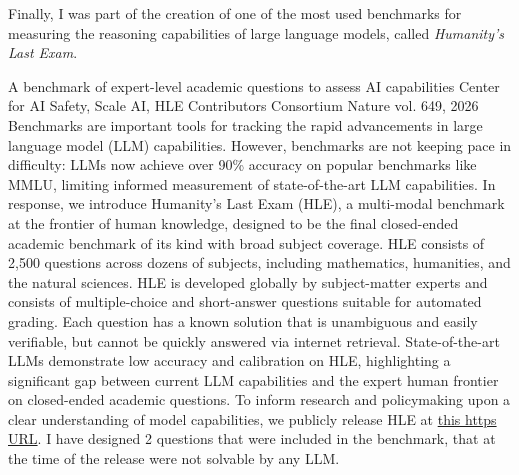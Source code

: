 Finally, I was part of the creation of one of the most used benchmarks for measuring the reasoning capabilities of large language models, called \emph{Humanity's Last Exam}.
\begin{contribution}
  {A benchmark of expert-level academic questions to assess {AI} capabilities}
  {{Center for AI Safety}, {Scale AI}, {HLE Contributors Consortium}}
  {Nature vol. 649, 2026}
  {Benchmarks are important tools for tracking the rapid advancements in large language model (LLM) capabilities. However, benchmarks are not keeping pace in difficulty: LLMs now achieve over 90\% accuracy on popular benchmarks like MMLU, limiting informed measurement of state-of-the-art LLM capabilities. In response, we introduce Humanity's Last Exam (HLE), a multi-modal benchmark at the frontier of human knowledge, designed to be the final closed-ended academic benchmark of its kind with broad subject coverage. HLE consists of 2,500 questions across dozens of subjects, including mathematics, humanities, and the natural sciences. HLE is developed globally by subject-matter experts and consists of multiple-choice and short-answer questions suitable for automated grading. Each question has a known solution that is unambiguous and easily verifiable, but cannot be quickly answered via internet retrieval. State-of-the-art LLMs demonstrate low accuracy and calibration on HLE, highlighting a significant gap between current LLM capabilities and the expert human frontier on closed-ended academic questions. To inform research and policymaking upon a clear understanding of model capabilities, we publicly release HLE at \href{https://lastexam.ai/}{this https URL}.}
  I have designed 2 questions that were included in the benchmark, that at the time of the release were not solvable by any LLM.
\end{contribution}
